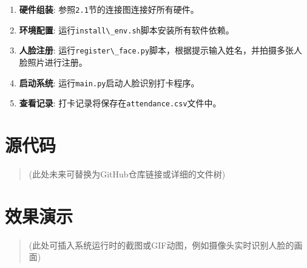 \begin{enumerate}
\def\labelenumi{\arabic{enumi}.}
\tightlist
\item
  \textbf{硬件组装}:
  参照\passthrough{\lstinline!2.1!}节的连接图连接好所有硬件。
\item
  \textbf{环境配置}:
  运行\passthrough{\lstinline!install\_env.sh!}脚本安装所有软件依赖。
\item
  \textbf{人脸注册}:
  运行\passthrough{\lstinline!register\_face.py!}脚本，根据提示输入姓名，并拍摄多张人脸照片进行注册。
\item
  \textbf{启动系统}:
  运行\passthrough{\lstinline!main.py!}启动人脸识别打卡程序。
\item
  \textbf{查看记录}:
  打卡记录将保存在\passthrough{\lstinline!attendance.csv!}文件中。
\end{enumerate}

\section{源代码}\label{ux6e90ux4ee3ux7801}

\begin{quote}
(此处未来可替换为GitHub仓库链接或详细的文件树)
\end{quote}

\section{效果演示}\label{ux6548ux679cux6f14ux793a}

\begin{quote}
(此处可插入系统运行时的截图或GIF动图，例如摄像头实时识别人脸的画面)
\end{quote}
